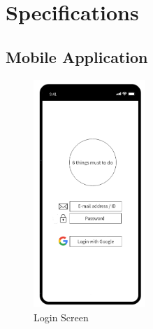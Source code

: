 \documentclass[conference]{IEEEtran}
\begin{document}
\section{Specifications}
\subsection{Mobile Application}

\begin{figure}[htp] \centering \includegraphics[width=120pt]{mockup_login} \caption{Login Screen} \label{fig:login} \end{figure}
\end{document}

